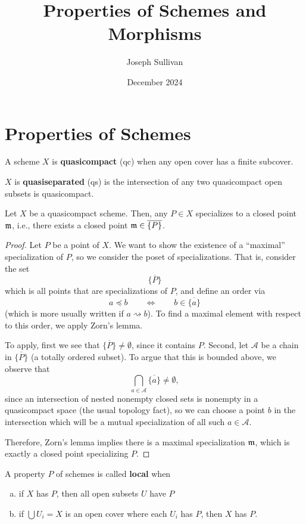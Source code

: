 \documentclass[12pt]{article}
\title{Properties of Schemes and Morphisms}
\author{Joseph Sullivan}
\date{December 2024}
\begin{document}
\maketitle

\tableofcontents


\section{Properties of Schemes}

\begin{defn}
    A scheme $X$ is \textbf{quasicompact} (qc) when any open cover has a finite subcover.

    $X$ is \textbf{quasiseparated} (qs) is the intersection of any two quasicompact open subsets is quasicompact.
\end{defn}

\begin{prop}
    Let $X$ be a quasicompact scheme. Then, any $P\in X$ specializes to a closed point $\mathfrak{m}$, i.e., there exists a closed point $\mathfrak{m} \in \overline{\{P\}}$.
\end{prop}
\begin{proof}
    Let $P$ be a point of $X$. We want to show the existence of a ``maximal'' specialization of $P$, so we consider the poset of specializations. That is, consider the set
    \[\overline{\{P\}}\]
    which is all points that are specializations of $P$, and define an order via
    \[a \preceq b \qquad \iff \qquad b \in \overline{\{a\}}\]
    (which is more usually written if $a\rightsquigarrow b$). To find a maximal element with respect to this order, we apply Zorn's lemma.

    To apply, first we see that $\overline{\{P\}}\neq \emptyset$, since it contains $P$. Second, let $\mathcal A$ be a chain in $\overline{\{P\}}$ (a totally ordered subset). To argue that this is bounded above, we observe that
    \[\bigcap_{a\in \mathcal A} \overline{\{a\}} \neq \emptyset,\]
    since an intersection of nested nonempty closed sets is nonempty in a quasicompact space (the usual topology fact), so we can choose a point $b$ in the intersection which will be a mutual specialization of all such $a\in \mathcal A$.

    Therefore, Zorn's lemma implies there is a maximal specialization $\mathfrak{m}$, which is exactly a closed point specializing $P$.
\end{proof}

\begin{defn}
    A property $P$ of schemes is called \textbf{local} when
    \begin{enumerate}[(a)]
        \item if $X$ has $P$, then all open subsets $U$ have $P$
        \item if $\bigcup U_i = X$ is an open cover where each $U_i$ has $P$, then $X$ has $P$.
    \end{enumerate}
\end{defn}
\end{document}
